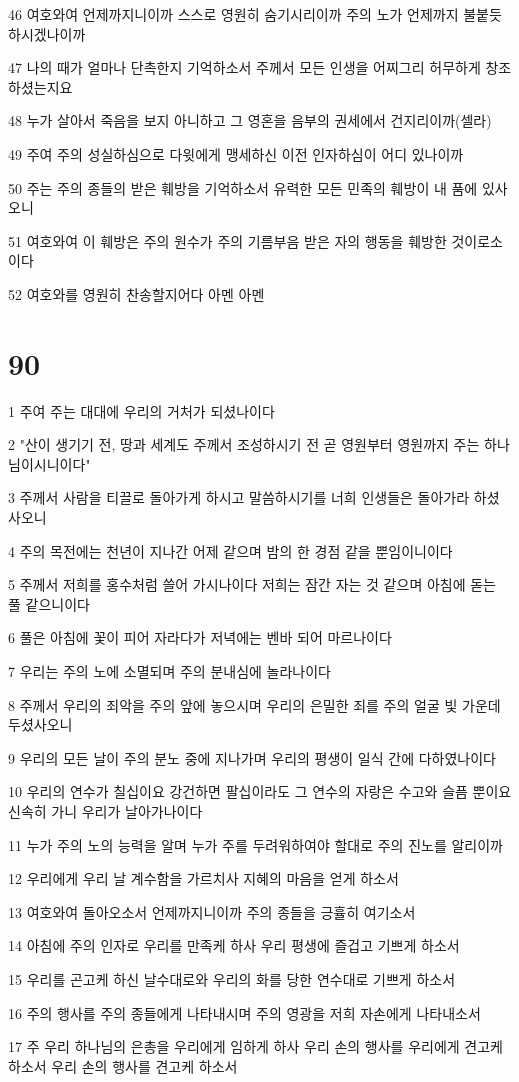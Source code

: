 \par 46 여호와여 언제까지니이까 스스로 영원히 숨기시리이까 주의 노가 언제까지 불붙듯 하시겠나이까
\par 47 나의 때가 얼마나 단촉한지 기억하소서 주께서 모든 인생을 어찌그리 허무하게 창조하셨는지요
\par 48 누가 살아서 죽음을 보지 아니하고 그 영혼을 음부의 권세에서 건지리이까(셀라)
\par 49 주여 주의 성실하심으로 다윗에게 맹세하신 이전 인자하심이 어디 있나이까
\par 50 주는 주의 종들의 받은 훼방을 기억하소서 유력한 모든 민족의 훼방이 내 품에 있사오니
\par 51 여호와여 이 훼방은 주의 원수가 주의 기름부음 받은 자의 행동을 훼방한 것이로소이다
\par 52 여호와를 영원히 찬송할지어다 아멘 아멘

\chapter{90}

\par 1 주여 주는 대대에 우리의 거처가 되셨나이다
\par 2 "산이 생기기 전, 땅과 세계도 주께서 조성하시기 전 곧 영원부터 영원까지 주는 하나님이시니이다"
\par 3 주께서 사람을 티끌로 돌아가게 하시고 말씀하시기를 너희 인생들은 돌아가라 하셨사오니
\par 4 주의 목전에는 천년이 지나간 어제 같으며 밤의 한 경점 같을 뿐임이니이다
\par 5 주께서 저희를 홍수처럼 쓸어 가시나이다 저희는 잠간 자는 것 같으며 아침에 돋는 풀 같으니이다
\par 6 풀은 아침에 꽃이 피어 자라다가 저녁에는 벤바 되어 마르나이다
\par 7 우리는 주의 노에 소멸되며 주의 분내심에 놀라나이다
\par 8 주께서 우리의 죄악을 주의 앞에 놓으시며 우리의 은밀한 죄를 주의 얼굴 빛 가운데 두셨사오니
\par 9 우리의 모든 날이 주의 분노 중에 지나가며 우리의 평생이 일식 간에 다하였나이다
\par 10 우리의 연수가 칠십이요 강건하면 팔십이라도 그 연수의 자랑은 수고와 슬픔 뿐이요 신속히 가니 우리가 날아가나이다
\par 11 누가 주의 노의 능력을 알며 누가 주를 두려워하여야 할대로 주의 진노를 알리이까
\par 12 우리에게 우리 날 계수함을 가르치사 지혜의 마음을 얻게 하소서
\par 13 여호와여 돌아오소서 언제까지니이까 주의 종들을 긍휼히 여기소서
\par 14 아침에 주의 인자로 우리를 만족케 하사 우리 평생에 즐겁고 기쁘게 하소서
\par 15 우리를 곤고케 하신 날수대로와 우리의 화를 당한 연수대로 기쁘게 하소서
\par 16 주의 행사를 주의 종들에게 나타내시며 주의 영광을 저희 자손에게 나타내소서
\par 17 주 우리 하나님의 은총을 우리에게 임하게 하사 우리 손의 행사를 우리에게 견고케 하소서 우리 손의 행사를 견고케 하소서

